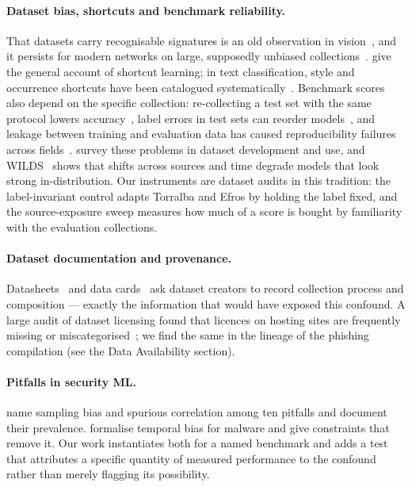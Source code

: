\documentclass[twoside,11pt]{article}
\begin{document}
\paragraph{Dataset bias, shortcuts and benchmark reliability.}
That datasets carry recognisable signatures is an old observation in
vision~\citep{torralba2011}, and it persists for modern networks on large,
supposedly unbiased collections~\citep{liu2025decade}. \citet{geirhos2020} give the general account of shortcut learning; in text
classification, style and occurrence shortcuts have been catalogued
systematically~\citep{zhou2024shortcut}. Benchmark scores also depend on the
specific collection: re-collecting a test set with the same protocol lowers
accuracy~\citep{recht2019imagenet}, label errors in test sets can reorder
models~\citep{northcutt2021pervasive}, and leakage between training and
evaluation data has caused reproducibility failures across
fields~\citep{kapoor2023leakage}. \citet{paullada2021data}
survey these problems in dataset development and use, and WILDS~\citep{koh2021wilds}
shows that shifts across sources and time degrade models that look strong
in-distribution. Our instruments are dataset audits in this tradition: the
label-invariant control adapts Torralba and Efros by holding the label fixed,
and the source-exposure sweep measures how much of a score is bought by
familiarity with the evaluation collections.

\paragraph{Dataset documentation and provenance.}
Datasheets~\citep{gebru2021datasheets} and data cards~\citep{pushkarna2022datacards}
ask dataset creators to record collection process and composition --- exactly
the information that would have exposed this confound. A large audit of
dataset licensing found that licences on hosting sites are frequently missing
or miscategorised~\citep{longpre2024audit}; we find the same in the lineage of
the phishing compilation (see the Data Availability section).

\paragraph{Pitfalls in security ML.}
\citet{arp2022} name sampling bias and spurious correlation among
ten pitfalls and document their prevalence. \citet{pendlebury2019} formalise temporal bias for malware and give
constraints that remove it. Our work instantiates both for a named benchmark
and adds a test that attributes a specific quantity of measured performance to
the confound rather than merely flagging its possibility.
\end{document}
